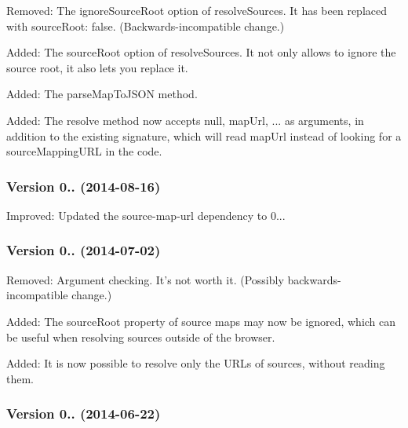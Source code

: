 \begin{DoxyItemize}
\item Removed\+: The {\ttfamily ignore\+Source\+Root} option of {\ttfamily resolve\+Sources}. It has been replaced with {\ttfamily source\+Root\+: false}. (Backwards-\/incompatible change.)
\item Added\+: The {\ttfamily source\+Root} option of {\ttfamily resolve\+Sources}. It not only allows to ignore the source root, it also lets you replace it.
\item Added\+: The {\ttfamily parse\+Map\+To\+J\+S\+ON} method.
\item Added\+: The {\ttfamily resolve} method now accepts {\ttfamily null, map\+Url, ...} as arguments, in addition to the existing signature, which will read {\ttfamily map\+Url} instead of looking for a source\+Mapping\+U\+RL in the code.
\end{DoxyItemize}

\subsubsection*{Version 0.. (2014-\/08-\/16)}


\begin{DoxyItemize}
\item Improved\+: Updated the source-\/map-\/url dependency to 0...
\end{DoxyItemize}

\subsubsection*{Version 0.. (2014-\/07-\/02)}


\begin{DoxyItemize}
\item Removed\+: Argument checking. It’s not worth it. (Possibly backwards-\/incompatible change.)
\item Added\+: The {\ttfamily source\+Root} property of source maps may now be ignored, which can be useful when resolving sources outside of the browser.
\item Added\+: It is now possible to resolve only the U\+R\+Ls of sources, without reading them.
\end{DoxyItemize}

\subsubsection*{Version 0.. (2014-\/06-\/22)}


